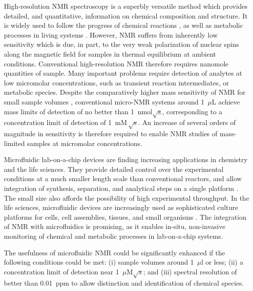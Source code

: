  High-resolution NMR
 spectroscopy is a superbly versatile method which provides detailed, and
 quantitative, information on chemical composition and structure. It is widely
 used to follow the progress of chemical reactions
 \cite{Foley-quantitative:2004bk,Foley:2014kpa},
 as well as
 metabolic processes in living systems
 \cite{Wishart:2008ga,Gottschalk:2008ixa,CuperlovicCulf:2010vc,Shintu:2012bl}.
 However, NMR suffers from inherently low sensitivity
 which is due, in part, to the very weak polarization of nuclear spins along the magnetic
 field for samples in thermal equilibrium at ambient conditions.
 Conventional high-resolution NMR therefore requires nanomole quantities of
 sample. Many important problems require detection of analytes at low
 micromolar concentrations, such as transient reaction intermediates, or
 metabolic species. Despite the
 comparatively higher mass sensitivity of NMR for small sample volumes
 \cite{Olson:1995vu,Bart:2009kc}, conventional micro-NMR systems  around
 1~$\mu$L achieve mass limits of detection of no better than \cite{Finch:2016gv}
 1~nmol$\sqrt{\mathrm{s}}$,  corresponding to a concentration
 limit of detection of 1~$\mathrm{m M \, \sqrt{s}}$. An increase of several
 orders of magnitude in sensitivity is therefore required to enable NMR
 studies of mass-limited samples at micromolar concentrations.

 Microfluidic lab-on-a-chip devices are finding increasing applications in
 chemistry and the
 life sciences. They provide detailed control over the experimental
 conditions at a much smaller length scale than conventional reactors, and
 allow integration of synthesis, separation, and analytical steps on
 a single platform \cite{Wang:2006en,Theberge:2012iq,Hoang:2011du,Ohno:2008da,Zhou:2004id,
 Fang:2018ib,Hoang:2011ee,Gunther:2006vd}. The small size also affords the possibility of
 high experimental throughput.
 In the life sciences, microfluidic devices are increasingly used as
 sophisticated culture platforms for cells,
 cell assemblies, tissues, and small organisms
 \cite{Whitesides:2006vi,
 ElAli:2006ci,West:2008jd,Neuzil:2012gc,Gracz:2015co}.
 The integration of NMR with microfluidics
 \cite{Ryan:2012ke,Badilita:2011td,Spengler:2014ir,Finch:2016gv} is promising, as
 it enables in-situ, non-invasive monitoring of chemical and metabolic processes
 in lab-on-a-chip systems.

 The usefulness of microfluidic NMR could be significantly
 enhanced if the following conditions could be met:
 (i) sample volumes around 1~$\mu$l or less;
 (ii) a concentration limit of
 detection near  1~$\mu$M$\sqrt{s}$; and
 (iii)  spectral
 resolution of better than 0.01~ppm to allow distinction and identification
 of chemical species.

